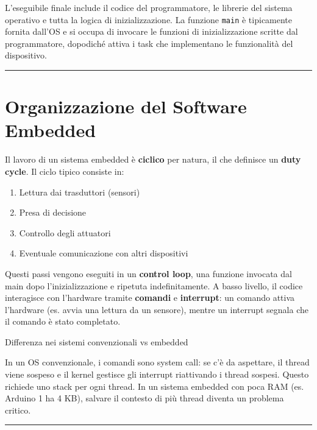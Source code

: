 \documentclass[
  italian,
  openany]{book}
\providecommand{\tightlist}{%
  \setlength{\itemsep}{0pt}\setlength{\parskip}{0pt}}
\begin{document}
L'eseguibile finale include il codice del programmatore, le librerie del
sistema operativo e tutta la logica di inizializzazione. La funzione
\texttt{main} è tipicamente fornita dall'OS e si occupa di invocare le
funzioni di inizializzazione scritte dal programmatore, dopodiché attiva
i task che implementano le funzionalità del dispositivo.

\begin{center}\rule{0.5\linewidth}{0.5pt}\end{center}

\section{Organizzazione del Software
Embedded}\label{organizzazione-del-software-embedded}

Il lavoro di un sistema embedded è \textbf{ciclico} per natura, il che
definisce un \textbf{duty cycle}. Il ciclo tipico consiste in:

\begin{enumerate}
\def\labelenumi{\arabic{enumi}.}
\tightlist
\item
  Lettura dai trasduttori (sensori)
\item
  Presa di decisione
\item
  Controllo degli attuatori
\item
  Eventuale comunicazione con altri dispositivi
\end{enumerate}

Questi passi vengono eseguiti in un \textbf{control loop}, una funzione
invocata dal main dopo l'inizializzazione e ripetuta indefinitamente. A
basso livello, il codice interagisce con l'hardware tramite
\textbf{comandi} e \textbf{interrupt}: un comando attiva l'hardware (es.
avvia una lettura da un sensore), mentre un interrupt segnala che il
comando è stato completato.

\begin{callouttip}{Differenza nei sistemi convenzionali vs embedded}

In un OS convenzionale, i comandi sono system call: se c'è da aspettare,
il thread viene sospeso e il kernel gestisce gli interrupt riattivando i
thread sospesi. Questo richiede uno stack per ogni thread. In un sistema
embedded con poca RAM (es. Arduino 1 ha 4 KB), salvare il contesto di
più thread diventa un problema critico.

\end{callouttip}

\begin{center}\rule{0.5\linewidth}{0.5pt}\end{center}
\end{document}

